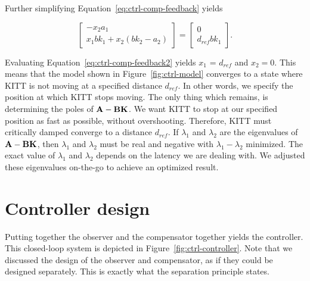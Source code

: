 \documentclass[11pt,titlepage]{report}
\begin{document}
Further simplifying Equation~\ref{eq:ctrl-comp-feedback} yields

\begin{equation} \label{eq:ctrl-comp-feedback2}
	\begin{bmatrix}
		 -x_2 a_1 \\
		x_1 b k_1 + x_2 (b k_2 - a_2)
	\end{bmatrix} = \begin{bmatrix}
		0 \\
		d_{ref} b k_1
	\end{bmatrix}.
\end{equation}

Evaluating Equation~\ref{eq:ctrl-comp-feedback2} yields $x_1$ = $d_{ref}$ and $x_2=0$. This means that the model shown in Figure~\ref{fig:ctrl-model} converges to a state where KITT is not moving at a specified distance $d_{ref}$. In other words, we specify the position at which KITT stops moving. The only thing which remains, is determining the poles of $\mathbf{A} - \mathbf{B} \mathbf{K}$. We want KITT to stop at our specified position as fast as possible, without overshooting. Therefore, KITT must critically damped converge to a distance $d_{ref}$. If $\lambda_1$ and $\lambda_2$ are the eigenvalues of $\mathbf{A} - \mathbf{B} \mathbf{K}$, then $\lambda_1$ and $\lambda_2$ must be real and negative with $\lambda_1 - \lambda_2$ minimized. The exact value of $\lambda_1$ and $\lambda_2$ depends on the latency we are dealing with. We adjusted these eigenvalues on-the-go to achieve an optimized result.

\section{Controller design}
Putting together the observer and the compensator together yields the controller. This closed-loop system is depicted in Figure~\ref{fig:ctrl-controller}. Note that we discussed the design of the observer and compensator, as if they could be designed separately. This is exactly what the separation principle states. 
\end{document}
